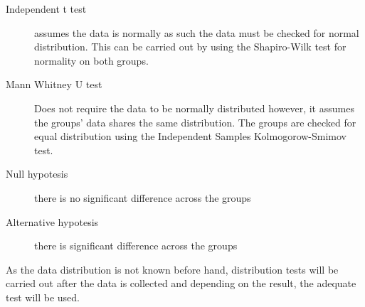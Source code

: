 \begin{description}
	\item[Independent t test] assumes the data is normally as such the data must be checked for normal distribution. This can be carried out by using the Shapiro-Wilk\cite{de2015statsref} test for normality on both groups.
	
	\item[Mann Whitney U test] Does not require the data to be normally distributed however, it assumes the groups' data shares the same distribution. The groups are checked for equal distribution using the Independent Samples Kolmogorow-Smimov test.
	
	\item[Null hypotesis]there is no significant difference across the groups
	\item[Alternative hypotesis]there is significant difference across the groups
\end{description}

As the data distribution is not known before hand, distribution tests will be carried out after the data is collected and depending on the result, the adequate test will be used.